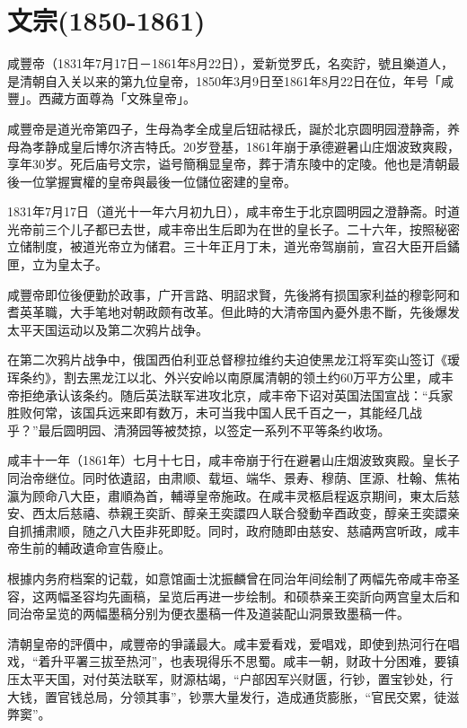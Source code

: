 
\section{文宗\tiny(1850-1861)}

咸豐帝（1831年7月17日－1861年8月22日），爱新觉罗氏，名奕詝，號且樂道人，是清朝自入关以来的第九位皇帝，1850年3月9日至1861年8月22日在位，年号「咸豐」。西藏方面尊為「文殊皇帝」。

咸豐帝是道光帝第四子，生母為孝全成皇后钮祜禄氏，誕於北京圆明园澄静斋，养母為孝静成皇后博尔济吉特氏。20岁登基，1861年崩于承德避暑山庄烟波致爽殿，享年30岁。死后庙号文宗，谥号簡稱显皇帝，葬于清东陵中的定陵。他也是清朝最後一位掌握實權的皇帝與最後一位儲位密建的皇帝。

1831年7月17日（道光十一年六月初九日），咸丰帝生于北京圆明园之澄静斋。时道光帝前三个儿子都已去世，咸丰帝出生后即为在世的皇长子。二十六年，按照秘密立储制度，被道光帝立为储君。三十年正月丁未，道光帝驾崩前，宣召大臣开启鐍匣，立为皇太子。

咸豐帝即位後便勤於政事，广开言路、明詔求賢，先後將有损国家利益的穆彰阿和耆英革職，大手笔地对朝政颇有改革。但此時的大清帝国內憂外患不斷，先後爆发太平天国运动以及第二次鸦片战争。

在第二次鸦片战争中，俄国西伯利亚总督穆拉维约夫迫使黑龙江将军奕山签订《瑷珲条约》，割去黑龙江以北、外兴安岭以南原属清朝的领土约60万平方公里，咸丰帝拒绝承认该条约。随后英法联军进攻北京，咸丰帝下诏对英国法国宣战：“兵家胜败何常，该国兵远来即有数万，未可当我中国人民千百之一，其能经几战乎？”最后圆明园、清漪园等被焚掠，以签定一系列不平等条约收场。

咸丰十一年（1861年）七月十七日，咸丰帝崩于行在避暑山庄烟波致爽殿。皇长子同治帝继位。同时依遺詔，由肃顺、载垣、端华、景寿、穆荫、匡源、杜翰、焦祐瀛为顾命八大臣，肅順為首，輔導皇帝施政。在咸丰灵柩启程返京期间，東太后慈安、西太后慈禧、恭親王奕訢、醇亲王奕譞四人联合發動辛酉政变，醇亲王奕譞亲自抓捕肃顺，随之八大臣非死即貶。同时，政府随即由慈安、慈禧两宫听政，咸丰帝生前的輔政遺命宣告廢止。

根據内务府档案的记载，如意馆画士沈振麟曾在同治年间绘制了两幅先帝咸丰帝圣容，这两幅圣容均先画稿，呈览后再进一步绘制。和硕恭亲王奕訢向两宫皇太后和同治帝呈览的两幅墨稿分别为便衣墨稿一件及道装配山洞景致墨稿一件。

清朝皇帝的評價中，咸豐帝的爭議最大。咸丰爱看戏，爱唱戏，即使到热河行在唱戏，“着升平署三拔至热河”，也表現得乐不思蜀。咸丰一朝，财政十分困难，要镇压太平天国，对付英法联军，财源枯竭，“户部因军兴财匮，行钞，置宝钞处，行大钱，置官钱总局，分领其事”，钞票大量发行，造成通货膨胀，“官民交累，徒滋弊窦”。

